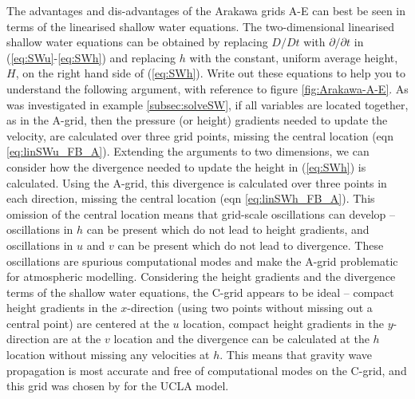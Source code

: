 The advantages and dis-advantages of the Arakawa grids A-E can best
be seen in terms of the linearised shallow water equations. The two-dimensional
linearised shallow water equations can be obtained by replacing $D/Dt$
with $\partial/\partial t$ in (\ref{eq:SWu}-\ref{eq:SWh}) and replacing
$h$ with the constant, uniform average height, $H$, on the right
hand side of (\ref{eq:SWh}). Write out these equations to help you
to understand the following argument, with reference to figure \ref{fig:Arakawa-A-E}.
As was investigated in example \ref{subsec:solveSW}, if all variables
are located together, as in the A-grid, then the pressure (or height)
gradients needed to update the velocity, are calculated over three
grid points, missing the central location (eqn \ref{eq:linSWu_FB_A}).
Extending the arguments to two dimensions, we can consider how the
divergence needed to update the height in (\ref{eq:SWh}) is calculated.
Using the A-grid, this divergence is calculated over three points
in each direction, missing the central location (eqn \ref{eq:linSWh_FB_A}).
This omission of the central location means that grid-scale oscillations
can develop -- oscillations in $h$ can be present which do not lead
to height gradients, and oscillations in $u$ and $v$ can be present
which do not lead to divergence. These oscillations are spurious computational
modes and make the A-grid problematic for atmospheric modelling. Considering
the height gradients and the divergence terms of the shallow water
equations, the C-grid appears to be ideal -- compact height gradients
in the $x$-direction (using two points without missing out a central
point) are centered at the $u$ location, compact height gradients
in the $y$-direction are at the $v$ location and the divergence
can be calculated at the $h$ location without missing any velocities
at $h$. This means that gravity wave propagation is most accurate
and free of computational modes on the C-grid, and this grid was chosen
by \citet{AL77} for the UCLA model. 

